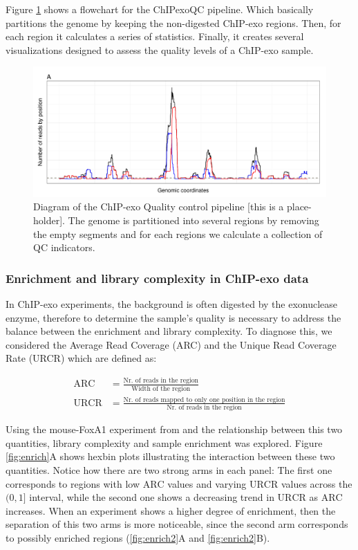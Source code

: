 \documentclass{bmcart}\usepackage[]{graphicx}\usepackage[]{color}
\begin{document}
Figure \ref{fig:qcdiagram} shows a flowchart for the ChIPexoQC
pipeline. Which basically partitions the genome by keeping the
non-digested ChIP-exo regions. Then, for each region it calculates a
series of statistics. Finally, it creates several visualizations
designed to assess the quality levels of a ChIP-exo sample.

\begin{figure}[h!]
  \centering
  \includegraphics[width = .9\textwidth]{../figs/for_paper/coverage_diagram.pdf}
  \caption{Diagram of the ChIP-exo Quality control pipeline [this is a
    place-holder]. The genome is partitioned into several regions by
    removing the empty segments and for each regions we calculate a
    collection of QC indicators.}
  \label{fig:qcdiagram}
\end{figure}

\subsubsection{Enrichment and library complexity in ChIP-exo data}
\label{sec:enri}

In ChIP-exo experiments, the background is often digested by the
exonuclease enzyme, therefore to determine the sample's quality is
necessary to address the balance between the enrichment and library
complexity. To diagnose this, we considered the Average Read Coverage
(ARC) and the Unique Read Coverage Rate (URCR) which are defined as:

\begin{align}
  \mbox{ARC} &= \frac{\text{Nr. of reads in the region}}{\text{Width of the region}} \nonumber \\
  \mbox{URCR} &= \frac{\text{Nr. of reads mapped to only one position
      in the region}}{\text{Nr. of reads in the region}} \nonumber
\end{align}

Using the mouse-FoxA1 experiment from \cite{exoillumina} and the
relationship between this two quantities, library complexity and
sample enrichment was explored. Figure \ref{fig:enrich}A shows hexbin
plots illustrating the interaction between these two
quantities. Notice how there are two strong arms in each panel: The
first one corresponds to regions with low $\mbox{ARC}$ values and
varying $\mbox{URCR}$ values across the $(0,1]$ interval, while the
second one shows a decreasing trend in $\mbox{URCR}$ as $\mbox{ARC}$
increases. When an experiment shows a higher degree of enrichment,
then the separation of this two arms is more noticeable, since the
second arm corresponds to possibly enriched regions
(\ref{fig:enrich2}A and \ref{fig:enrich2}B).
\end{document}
